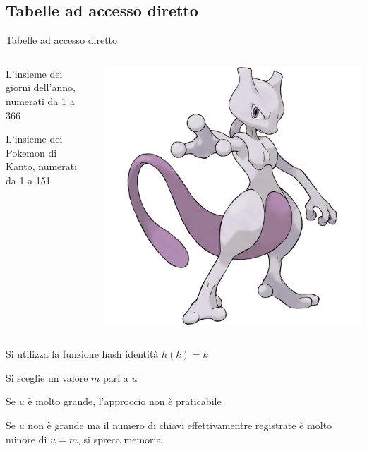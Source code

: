 \subsection{Tabelle ad accesso diretto}


\begin{frame}{Tabelle ad accesso diretto}

\vspace{-6pt}
\begin{columns}[T]
\begin{column}{0.9\textwidth}
\BI
\item L'insieme dei giorni dell'anno, numerati da 1 a 366
\item L'insieme dei Pokemon di Kanto, numerati da 1 a 151
\EI
\end{column}
\begin{column}{0.1\textwidth}
\includegraphics[width=	\textwidth]{mewtwo.png}
\end{column}
\end{columns}

\begin{myboxtitle}
\BI
\item Si utilizza la funzione hash identità $h(k)=k$
\item Si sceglie un valore $m$ pari a $u$
\EI
\end{myboxtitle}

\begin{myboxtitle}[Problemi]
\BI
\item Se $u$ è molto grande, l'approccio non è  praticabile 
\item Se $u$ non è grande ma il numero di chiavi 
effettivamentre registrate è molto minore di $u=m$, si spreca memoria
\EI
\end{myboxtitle}

\end{frame}

